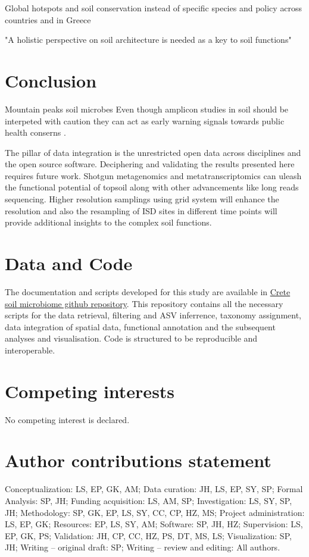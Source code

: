 Global hotspots \parencite{Guerra2022}
and soil conservation instead of specific species \parencite{guerra2021tracking}
and policy \parencite{KONINGER2022} across countries \parencite{Putten2023} and in Greece \parencite{SCHISMENOS2022100035}

"A holistic perspective on soil architecture is needed as a key to soil functions" \parencite{philippot2024the-interplay}
\section{Conclusion}

Mountain peaks soil microbes \parencite{Adamczyk2019}
Even though amplicon studies in soil should be interpeted with caution \parencite{alteio2021} they 
can act as early warning signals towards public health conserns \parencite{banerjee2023Soil}.

The pillar of data integration is the unrestricted open data across disciplines and 
the open source software.
Deciphering and validating the results presented here requires future work.
Shotgun metagenomics and metatranscriptomics can uleash the functional potential of
topsoil along with other advancements like long reads sequencing. Higher resolution
samplings using grid system will enhance the resolution and also the resampling of
ISD sites in different time points will provide additional insights to the complex soil 
functions.

\section{Data and Code}
The documentation and scripts developed for this study are available in
\href{https://github.com/savvas-paragkamian/crete_soil_microbiome/}{Crete soil microbiome github repository}.
This repository contains all the necessary scripts for the data retrieval,
filtering and ASV inferrence, taxonomy assignment, data integration of spatial data, 
functional annotation and the subsequent analyses and visualisation.
Code is structured to be reproducible and interoperable.

\section{Competing interests}
No competing interest is declared.

\section{Author contributions statement}
Conceptualization: LS, EP, GK, AM;
Data curation: JH, LS, EP, SY, SP;
Formal Analysis: SP, JH;
Funding acquisition: LS, AM, SP;
Investigation: LS, SY, SP, JH;
Methodology: SP, GK, EP, LS, SY, CC, CP, HZ, MS;
Project administration: LS, EP, GK;
Resources: EP, LS, SY, AM;
Software: SP, JH, HZ;
Supervision: LS, EP, GK, PS;
Validation: JH, CP, CC, HZ, PS, DT, MS, LS;
Visualization: SP, JH;
Writing – original draft: SP;
Writing – review and editing: All authors.

